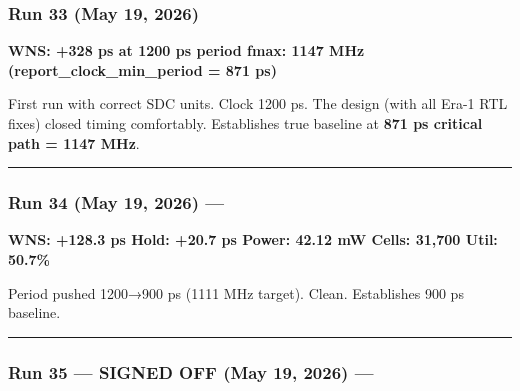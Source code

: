 \subsubsection{Run 33 (May 19, 2026)}\label{cr:run:asap7:run-33-may-19-2026}

\begin{record}

\textbf{WNS: +328 ps at 1200 ps period \textbar{} fmax: 1147 MHz
(report\_\allowbreak{}clock\_\allowbreak{}min\_\allowbreak{}period = 871
ps)}

First run with correct SDC units. Clock 1200 ps. The design (with all
Era-1 RTL fixes) closed timing comfortably. Establishes true baseline at
\textbf{871 ps critical path = 1147 MHz}.

\begin{center}\rule{0.5\linewidth}{0.5pt}\end{center}

\end{record}

\subsubsection{\texorpdfstring{Run 34 (May 19, 2026) ---
}{Run 34 (May 19, 2026) --- }}\label{cr:run:asap7:run-34-may-19-2026-run-2026-05-19-08-56-42}

\begin{record}

\textbf{WNS: +128.3 ps \textbar{} Hold: +20.7 ps \textbar{} Power: 42.12
mW \textbar{} Cells: 31,700 \textbar{} Util: 50.7\%}

Period pushed 1200→900 ps (1111 MHz target). Clean. Establishes 900 ps
baseline.

\begin{center}\rule{0.5\linewidth}{0.5pt}\end{center}

\end{record}

\subsubsection{\texorpdfstring{Run 35 --- SIGNED OFF \ok{} (May 19,
2026) ---
}{Run 35 --- SIGNED OFF  (May 19, 2026) --- }}\label{cr:run:asap7:run-35-signed-off-white-check-mark-may-19-2026-run-2026-05-19-10-47-29}

